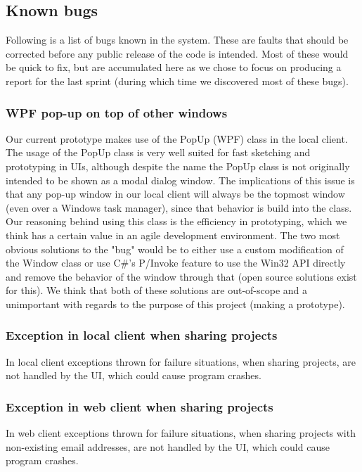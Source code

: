 \subsection{Known bugs}
\label{sec:bugs}

Following is a list of bugs known in the system. These are faults that should be corrected before any public
release of the code is intended. Most of these would be quick to fix, but are accumulated here as we chose
to focus on producing a report for the last sprint (during which time we discovered most of these bugs).

\subsubsection{WPF pop-up on top of other windows}
Our current prototype makes use of the PopUp (WPF) class in the local client. The usage of the PopUp class is very well suited for fast sketching and prototyping in UIs, although despite the name the PopUp class is not originally intended to be shown as a modal dialog window. The implications of this issue is that any pop-up window in our local client will always be the topmost window (even over a Windows task manager), since that behavior is build into the class. Our reasoning behind using this class is the efficiency in prototyping, which we think has a certain value in an agile development environment. The two most obvious solutions to the "bug" would be to either use a custom modification of the Window class or use C\#'s P/Invoke feature to use the Win32 API directly and remove the behavior of the window through that (open source solutions exist for this). We think that both of these solutions are out-of-scope and a unimportant with regards to the purpose of this project (making a prototype).

\subsubsection{Exception in local client when sharing projects}
In local client exceptions thrown for failure situations, when sharing projects, are not handled by the UI, which could cause program crashes.

\subsubsection{Exception in web client when sharing projects}
In web client exceptions thrown for failure situations, when sharing projects with non-existing email addresses, are not handled by the UI, which could cause program crashes.


